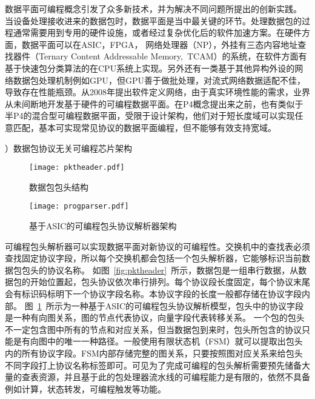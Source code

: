 数据平面可编程概念引发了众多新技术，并为解决不同问题所提出的创新实践。
当设备处理接收进来的数据包时，数据平面是当中最关键的环节。处理数据包的过程通常需要用到专用的硬件设施，或者经过复杂优化后的软件加速方案。在硬件方面，数据平面可以在ASIC，FPGA， 网络处理器（NP），外挂有三态内容地址查找器件（Ternary Content Addressable Memory,~TCAM）的系统，在软件方面有基于快速包分类算法的在CPU系统上实现。另外还有一类基于其他异构外设的网络数据包处理机制例如GPU，但GPU善于做批处理，对流式网络数据适配不佳，导致存在性能瓶颈。从2008年提出软件定义网络，由于真实环境性能的需求，业界从未间断地开发基于硬件的可编程数据平面。在P4概念提出来之前，也有类似于半P4的混合型可编程数据平面，受限于设计架构，他们对于短长度域可以实现任意匹配，基本可实现常见协议的数据平面编程，但不能够有效支持宽域。



{）数据包协议无关可编程芯片架构}




\begin{figure}[htbp]
	\centering 
	\vspace{-1.5mm}
	\begin{minipage}[t]{0.48\textwidth}
		\centering
		\texttt{[image: pktheader.pdf]}
		\caption{数据包包头结构} \label{fig:pktheader}
	\end{minipage}
	\begin{minipage}[t]{0.48\textwidth}
		\centering
		\texttt{[image: progparser.pdf]}
		\caption{基于ASIC的可编程包头协议解析器架构} \label{fig:progparser}
	\end{minipage}
\end{figure}



可编程包头解析器可以实现数据平面对新协议的可编程性。交换机中的查找表必须查找固定协议字段，所以每个交换机都会包括一个包头解析器，它能够标识当前数据包包头的协议名称。
如图~\ref{fig:pktheader}~所示，数据包是一组串行数据，从数据包的开始位置起，包头协议依次串行排列。每个协议段长度固定，每个协议末尾会有标识码标明下一个协议字段名称。本协议字段的长度一般都存储在协议字段内部。
图~\ref{fig:progparser}~所示为一种基于ASIC的可编程包头协议解析模型，包头中的协议字段是一种有向图关系，图的节点代表协议，向量字段代表转移关系。
一个包的包头不一定包含图中所有的节点和对应关系，但当数据包到来时，包头所包含的协议只能是有向图中的唯一一种路径。一般使用有限状态机（FSM）就可以提取出包头内的所有协议字段。FSM内部存储完整的图关系，只要按照图对应关系来给包头不同字段打上协议名称标签即可。可见为了完成可编程的包头解析需要预先储备大量的查表资源，并且基于此的包处理器流水线的可编程能力是有限的，依然不具备例如计算，状态转发，可编程触发等功能。

